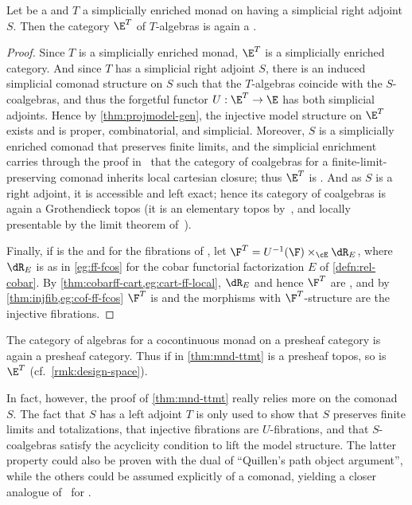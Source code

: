 \begin{thm}\label{thm:mnd-ttmt}
  Let \E be a \ttmt and $T$ a simplicially enriched \qucoft monad on \E having a simplicial right adjoint $S$.
  Then the category $\E^T$ of $T$-algebras is again a \ttmt.
\end{thm}
\begin{proof}
  Since $T$ is a simplicially enriched monad, $\E^T$ is a simplicially enriched category.
  And since $T$ has a simplicial right adjoint $S$, there is an induced simplicial comonad structure on $S$ such that the $T$-algebras coincide with the $S$-coalgebras, and thus the forgetful functor $U:\E^T\to\E$ has both simplicial adjoints.
  Hence by \cref{thm:projmodel-gen}, the injective model structure on $\E^T$ exists and is proper, combinatorial, and simplicial.
  Moreover, $S$ is a simplicially enriched comonad that preserves finite limits, and the simplicial enrichment carries through the proof in~\cite[Theorem A4.2.1]{ptj:elephant} that the category of coalgebras for a finite-limit-preserving comonad inherits local cartesian closure; thus $\E^T$ is \slcc.
  And as $S$ is a right adjoint, it is accessible and left exact; hence its category of coalgebras is again a Grothendieck topos (it is an elementary topos by~\cite[Theorem A4.2.1]{ptj:elephant}, and locally presentable by the limit theorem of~\cite{mp:accessible}).

  Finally, if \F is the \local and \stratified \nfs for the fibrations of \E, let $\F^T= U^{-1}(\F) \times_\cE \dR_E$, where $\dR_E$ is as in \cref{eg:ff-fcos} for the cobar functorial factorization $E$ of \cref{defn:rel-cobar}.
  By \cref{thm:cobarff-cart,eg:cart-ff-local}, $\dR_E$ and hence $\F^T$ are \local, and by \cref{thm:injfib,eg:cof-ff-fcos} $\F^T$ is \stratified and the morphisms with $\F^T$-structure are the injective fibrations.
\end{proof}

\begin{rmk}
  The category of algebras for a cocontinuous monad on a presheaf category is again a presheaf category.
  Thus if \E in \cref{thm:mnd-ttmt} is a presheaf topos, so is $\E^T$ (cf.~\cref{rmk:design-space}).

  In fact, however, the proof of \cref{thm:mnd-ttmt} really relies more on the comonad $S$.
  The fact that $S$ has a left adjoint $T$ is only used to show that $S$ preserves finite limits and totalizations, that injective fibrations are $U$-fibrations, and that $S$-coalgebras satisfy the acyclicity condition to lift the model structure.
  The latter property could also be proven with the dual of ``Quillen's path object argument'', while the others could be assumed explicitly of a comonad, yielding a closer analogue of~\cite[Theorem A4.2.1]{ptj:elephant} for \ttmts. 
\end{rmk}

